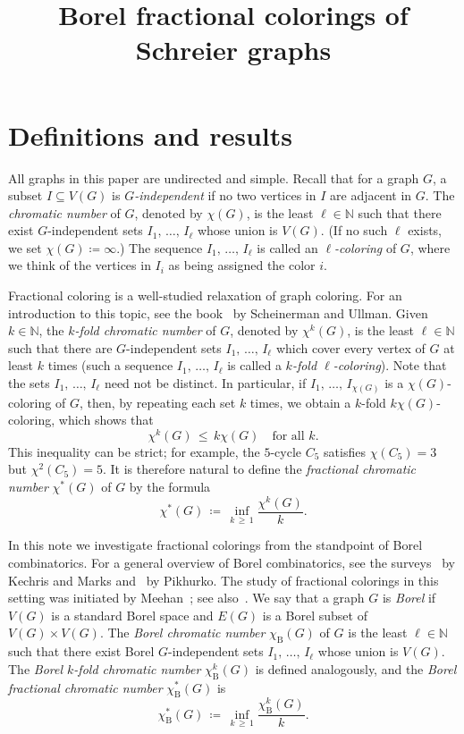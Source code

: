 \documentclass[AHL,Unicode,longabstracts,published]{cedram}
\title{Borel fractional colorings of Schreier graphs}
\author[\initial{A.} \lastname{Bernshteyn}]{\firstname{Anton} \lastname{Bernshteyn}}
\newcommand{\0}{\varnothing}
\renewcommand{\leq}{\leqslant}
\renewcommand{\geq}{\geqslant}
\newcommand{\defeq}{\coloneqq}
\newcommand{\N}{{\mathbb{N}}}
\newcommand{\rmB}{\mathrm{B}}
\begin{document}
\maketitle

\section{Definitions and results}

All graphs in this paper are undirected and simple. Recall that for a graph $G$, a subset $I \subseteq V(G)$ is \emph{$G$-independent} if no two vertices in $I$ are adjacent in $G$. The \emph{chromatic number} of $G$, denoted by $\chi(G)$, is the least $\ell \in \N$ such that there exist $G$-independent sets $I_1,\,\ldots,\,I_\ell$ whose union is $V(G)$. (If no such $\ell$ exists, we set $\chi(G)
\defeq \infty$.) The sequence $I_1,\,\ldots,\, I_\ell$ is called an \emph{$\ell$-coloring} of $G$, where we think of the vertices in $I_i$ as being assigned the color $i$.

Fractional coloring is a well-studied relaxation of graph coloring. For an introduction to this topic, see the book~\cite{FracBook} by Scheinerman and Ullman. Given $k \in \N$, the \emph{$k$-fold chromatic number} of $G$, denoted by $\chi^k(G)$, is the least $\ell \in \N$ such that there are $G$-independent sets $I_1,\,\ldots,\,I_\ell$ which cover every vertex of $G$ at least $k$ times (such a sequence $I_1,\, \ldots, \, I_\ell$ is called a \emph{$k$-fold $\ell$-coloring}). Note that the sets $I_1,\, \ldots,\, I_\ell$ need not be distinct. In particular, if $I_1,\, \ldots,\, I_{\chi(G)}$ is a $\chi(G)$-coloring of $G$, then, by repeating each set $k$ times, we obtain a $k$-fold $k\chi(G)$-coloring, which shows that
\[
\chi^k(G) \,\leq\, k \chi(G) \quad \text{for all } k.
\]
This inequality can be strict; for example, the $5$-cycle $C_5$ satisfies $\chi(C_5) = 3$ but $\chi^2(C_5) = 5$. It is therefore natural to define the \emph{fractional chromatic number} $\chi^\ast(G)$ of $G$ by the formula
\[
\chi^\ast(G) \,
\defeq\, \inf_{k\,\geq\,1} \frac{\chi^k(G)}{k}.
\]

In this note we investigate fractional colorings from the standpoint of Borel combinatorics. For a general overview of Borel combinatorics, see the surveys~\cite{KechrisMarks} by Kechris and Marks and~\cite{Pikh_survey} by Pikhurko. The study of fractional colorings in this setting was initiated by Meehan~\cite{Mee}; see also~\cite[\S~8.6]{KechrisMarks}. We say that a graph $G$ is \emph{Borel} if $V(G)$ is a standard Borel space and $E(G)$ is a Borel subset of $V(G) \times V(G)$. The \emph{Borel chromatic number} $\chi_\rmB(G)$ of $G$ is the least $\ell \in \N$ such that there exist {Borel} $G$-independent sets $I_1,\, \ldots, \,I_\ell$ whose union is $V(G)$. The \emph{Borel $k$-fold chromatic number} $\chi^k_{\rmB}(G)$ is defined analogously, and the \emph{Borel fractional chromatic number} $\chi^\ast_{\rmB}(G)$ is
\[
\chi^\ast_{\rmB}(G) \,
\defeq\, \inf_{k\,\geq\,1} \frac{\chi^k_{\rmB}(G)}{k}.
\]
\end{document}
